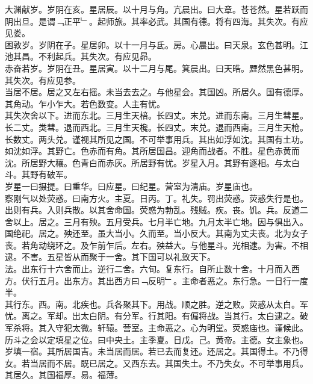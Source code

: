 \documentclass{zhvt-classic}
\begin{document}
\hspace*{2em}大渊献岁。岁阴在亥。星居辰。以十月与角。亢晨出。曰大章。苍苍然。星若跃而阴出旦。是谓﹁正平﹂。起师旅。其率必武。其国有德。将有四海。其失次。有应见娄。\\
\hspace*{2em}困敦岁。岁阴在子。星居卯。以十一月与氐。房。心晨出。曰天泉。玄色甚明。江池其昌。不利起兵。其失次。有应见昴。\\
\hspace*{2em}赤奋若岁。岁阴在丑。星居寅。以十二月与尾。箕晨出。曰天晧。黫然黑色甚明。其失次。有应见参。\\
\hspace*{2em}当居不居。居之又左右摇。未当去去之。与他星会。其国凶。所居久。国有德厚。其角动。乍小乍大。若色数变。人主有忧。\\
\hspace*{2em}其失次舍以下。进而东北。三月生天棓。长四丈。末兑。进而东南。三月生彗星。长二丈。类彗。退而西北。三月生天欃。长四丈。末兑。退而西南。三月生天枪。长数丈。两头兑。谨视其所见之国。不可举事用兵。其出如浮如沈。其国有土功。如沈如浮。其野亡。色赤而有角。其所居国昌。迎角而战者。不胜。星色赤黄而沈。所居野大穰。色青白而赤灰。所居野有忧。岁星入月。其野有逐相。与太白斗。其野有破军。\\
\hspace*{2em}岁星一曰摄提。曰重华。曰应星。曰纪星。营室为清庙。岁星庙也。\\
\hspace*{2em}察刚气以处荧惑。曰南方火。主夏。日丙。丁。礼失。罚出荧惑。荧惑失行是也。出则有兵。入则兵散。以其舍命国。荧惑为勃乱。残贼。疾。丧。饥。兵。反道二舍以上。居之。三月有殃。五月受兵。七月半亡地。九月太半亡地。因与俱出入。国绝祀。居之。殃还至。虽大当小。久而至。当小反大。其南为丈夫丧。北为女子丧。若角动绕环之。及乍前乍后。左右。殃益大。与他星斗。光相逮。为害。不相逮。不害。五星皆从而聚于一舍。其下国可以礼致天下。\\
\hspace*{2em}法。出东行十六舍而止。逆行二舍。六旬。复东行。自所止数十舍。十月而入西方。伏行五月。出东方。其出西方曰﹁反明﹂。主命者恶之。东行急。一日行一度半。\\
\hspace*{2em}其行东。西。南。北疾也。兵各聚其下。用战。顺之胜。逆之败。荧惑从太白。军忧。离之。军却。出太白阴。有分军。行其阳。有偏将战。当其行。太白逮之。破军杀将。其入守犯太微。轩辕。营室。主命恶之。心为明堂。荧惑庙也。谨候此。\\
\hspace*{2em}历斗之会以定填星之位。曰中央土。主季夏。日戊。己。黄帝。主德。女主象也。岁填一宿。其所居国吉。未当居而居。若已去而复还。还居之。其国得土。不乃得女。若当居而不居。既已居之。又西东去。其国失土。不乃失女。不可举事用兵。其居久。其国福厚。易。福薄。\\
\end{document}
